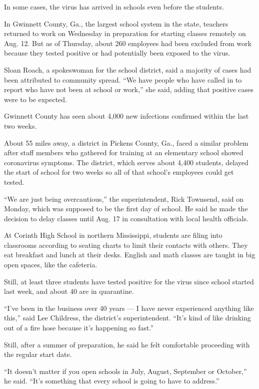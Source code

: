 In some cases, the virus has arrived in schools even before the
students.

In Gwinnett County, Ga., the largest school system in the state,
teachers returned to work on Wednesday in preparation for starting
classes remotely on Aug. 12. But as of Thursday, about 260 employees had
been excluded from work because they tested positive or had potentially
been exposed to the virus.

Sloan Roach, a spokeswoman for the school district, said a majority of
cases had been attributed to community spread. ``We have people who have
called in to report who have not been at school or work,'' she said,
adding that positive cases were to be expected.

Gwinnett County has seen about 4,000 new infections confirmed within the
last two weeks.

About 55 miles away, a district in Pickens County, Ga., faced a similar
problem after staff members who gathered for training at an elementary
school showed coronavirus symptoms. The district, which serves about
4,400 students, delayed the start of school for two weeks so all of that
school's employees could get tested.

``We are just being overcautious,'' the superintendent, Rick Townsend,
said on Monday, which was supposed to be the first day of school. He
said he made the decision to delay classes until Aug. 17 in consultation
with local health officials.

At Corinth High School in northern Mississippi, students are filing into
classrooms according to seating charts to limit their contacts with
others. They eat breakfast and lunch at their desks. English and math
classes are taught in big open spaces, like the cafeteria.

Still, at least three students have tested positive for the virus since
school started last week, and about 40 are in quarantine.

``I've been in the business over 40 years --- I have never experienced
anything like this,'' said Lee Childress, the district's superintendent.
``It's kind of like drinking out of a fire hose because it's happening
so fast.''

Still, after a summer of preparation, he said he felt comfortable
proceeding with the regular start date.

``It doesn't matter if you open schools in July, August, September or
October,'' he said. ``It's something that every school is going to have
to address.''

